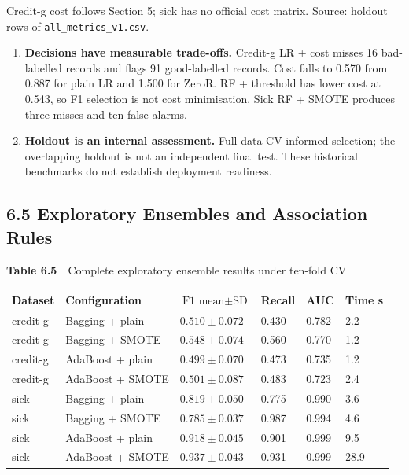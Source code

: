 Credit-g cost follows Section 5; sick has no official cost matrix.
Source: holdout rows of \texttt{all\_metrics\_v1.csv}.

\begin{enumerate}
\item \textbf{Decisions have measurable trade-offs.} Credit-g LR + cost misses 16
bad-labelled records and flags 91 good-labelled records. Cost falls to 0.570 from
0.887 for plain LR and 1.500 for ZeroR. RF + threshold has lower cost at 0.543, so F1
selection is not cost minimisation. Sick RF + SMOTE produces three misses and ten
false alarms.
\item \textbf{Holdout is an internal assessment.} Full-data CV informed selection; the
overlapping holdout is not an independent final test. These historical benchmarks do
not establish deployment readiness.
\end{enumerate}

\subsection*{6.5 Exploratory Ensembles and Association Rules}

\begin{center}
\begin{minipage}{\textwidth}
\centering
{\footnotesize\textbf{Table 6.5}\ \ Complete exploratory ensemble results under ten-fold CV}

\footnotesize
\begin{tabular}{p{0.75in}p{1.3in}p{1.05in}p{0.65in}p{0.55in}p{0.55in}}
\toprule
Dataset & Configuration & $\text{F1 mean} \pm \text{SD}$ & Recall & AUC & Time s \\
\midrule
credit-g & Bagging + plain & $0.510 \pm 0.072$ & 0.430 & 0.782 & 2.2 \\
credit-g & Bagging + SMOTE & $\mathbf{0.548 \pm 0.074}$ & 0.560 & 0.770 & 1.2 \\
credit-g & AdaBoost + plain & $0.499 \pm 0.070$ & 0.473 & 0.735 & 1.2 \\
credit-g & AdaBoost + SMOTE & $0.501 \pm 0.087$ & 0.483 & 0.723 & 2.4 \\
sick & Bagging + plain & $0.819 \pm 0.050$ & 0.775 & 0.990 & 3.6 \\
sick & Bagging + SMOTE & $0.785 \pm 0.037$ & 0.987 & 0.994 & 4.6 \\
sick & AdaBoost + plain & $0.918 \pm 0.045$ & 0.901 & 0.999 & 9.5 \\
sick & AdaBoost + SMOTE & $\mathbf{0.937 \pm 0.043}$ & 0.931 & 0.999 & 28.9 \\
\bottomrule
\end{tabular}
\end{minipage}
\end{center}

